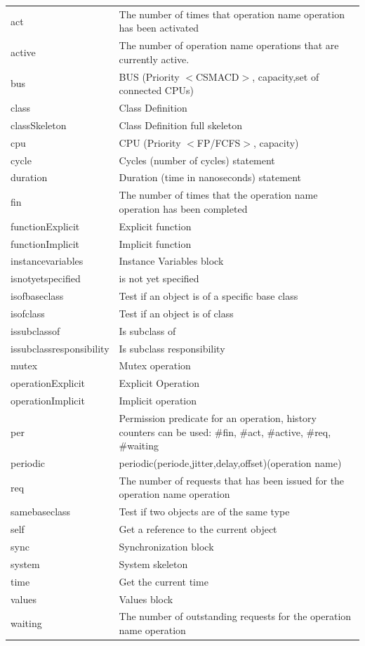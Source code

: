 \documentclass{overturerepchap}
\begin{document}
\begin{longtable}{| l| p{9cm}| }
act                       & The number of times that operation name operation has been activated\\
active                    & The number of operation name operations that are currently active.\\
bus                       & BUS (Priority $<$CSMACD$>$, capacity,set of connected CPUs)\\
class                     & Class Definition\\
classSkeleton             & Class Definition full skeleton\\
cpu                       & CPU (Priority $<$FP/FCFS$>$, capacity)\\
cycle                     & Cycles (number of cycles) statement\\
duration                  & Duration (time in nanoseconds) statement\\
fin                       & The number of times that the operation name operation has been completed\\
functionExplicit          & Explicit function\\
functionImplicit          & Implicit function\\
instancevariables         & Instance Variables block\\
isnotyetspecified         & is not yet specified\\
isofbaseclass             & Test if an object is of a specific base class\\
isofclass                 & Test if an object is of class\\
issubclassof              & Is subclass of\\
issubclassresponsibility  & Is subclass responsibility\\
mutex                     & Mutex operation\\
operationExplicit         & Explicit Operation\\
operationImplicit         & Implicit operation\\
per                       & Permission predicate for an operation, history counters can be used: \#fin, \#act, \#active, \#req, \#waiting\\
periodic                  & periodic(periode,jitter,delay,offset)(operation name)\\
req                       & The number of requests that has been issued for the operation name operation\\
samebaseclass             & Test if two objects are of the same type\\
self                      & Get a reference to the current object\\
sync                      & Synchronization block\\
system                    & System skeleton\\
time                      & Get the current time\\
values                    & Values block\\
waiting                   & The number of outstanding requests for the operation name operation\\\hline
\end{longtable}
\end{document}
